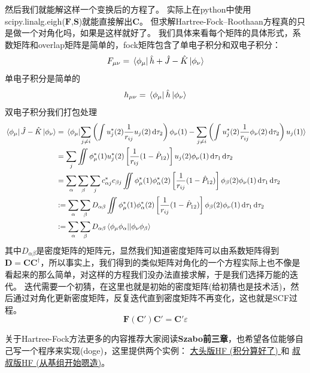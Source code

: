 然后我们就能解这样一个变换后的方程了。
实际上在python中使用scipy.linalg.eigh($\mathbf{F}$,$\mathbf{S}$)就能直接解出$\mathbf{C}$。
但求解Hartree-Fock–Roothaan方程真的只是做一个对角化吗，如果是这样就好了。
我们具体来看每个矩阵的具体形式，系数矩阵和overlap矩阵是简单的，fock矩阵包含了单电子积分和双电子积分：
\[F_{\mu\nu} = \bra*{\phi_{\mu}}\hat{h} + \hat{J} - \hat{K}\ket*{\phi_{\nu}}\]
单电子积分是简单的
\[h_{\mu\nu}=\bra*{\phi_{\mu}}\hat{h}\ket*{\phi_{\nu}}\]
双电子积分我们打包处理
\begin{equation*}
    \begin{aligned}
        \bra*{\phi_{\mu}}\hat{J} - \hat{K}\ket*{\phi_{\nu}} & = \bra*{\phi_{\mu}}\ket{\sum_{j \neq i}\left(\int u_j^*(2)\frac{1}{r_{ij}}u_j(2)\dd{\tau_2}\right)\phi_{\nu}(1)-\sum_{j \neq i}\left(\int u_j^*(2)\frac{1}{r_{ij}}\phi_{\nu}(2)\dd{\tau_2}\right)u_j(1)} \\
         & = \sum_{j}\iint \phi_{\mu}^*(1)u_j^*(2)\left[\frac{1}{r_{ij}}(1-\hat{P}_{12})\right]u_j(2)\phi_{\nu}(1) \dd{\tau_1}\dd{\tau_2} \\
         & = \sum_{\alpha}\sum_{\beta}\sum_{j}c^*_{\alpha j}c_{\beta j}\iint \phi_{\mu}^*(1)\phi_{\alpha}^*(2)\left[\frac{1}{r_{ij}}(1-\hat{P}_{12})\right]\phi_{\beta}(2)\phi_{\nu}(1) \dd{\tau_1}\dd{\tau_2} \\
         & := \sum_{\alpha}\sum_{\beta}D_{\alpha\beta}\iint \phi_{\mu}^*(1)\phi_{\alpha}^*(2)\left[\frac{1}{r_{ij}}(1-\hat{P}_{12})\right]\phi_{\beta}(2)\phi_{\nu}(1) \dd{\tau_1}\dd{\tau_2} \\
         & := \sum_{\alpha}\sum_{\beta}D_{\alpha\beta}\bra{\phi_{\mu}\phi_{\alpha}}\ket{|\phi_{\nu}\phi_{\beta}}
    \end{aligned}
\end{equation*}
其中$D_{\alpha\beta}$是密度矩阵的矩阵元，显然我们知道密度矩阵可以由系数矩阵得到$\mathbf{D}=\mathbf{C}\mathbf{C}^{\dagger}$，所以事实上，我们得到的类似矩阵对角化的一个方程实际上也不像是看起来的那么简单，对这样的方程我们没办法直接求解，于是我们选择万能的迭代。
迭代需要一个初猜，在这里也就是初始的密度矩阵(给初猜也是技术活)，然后通过对角化更新密度矩阵，反复迭代直到密度矩阵不再变化，这也就是SCF过程。
\[\mathbf{F}(\mathbf{C}')\mathbf{C}'=\mathbf{C}'\varepsilon\]

关于Hartree-Fock方法更多的内容推荐大家阅读\textbf{Szabo前三章}，也希望各位能够自己写一个程序来实现(doge)，这里提供两个实例：
\href{https://github.com/yangdatou/hf-tutorial}{大头版HF (积分算好了) }和
\href{https://github.com/Walter-Feng/Hartree-Fock-in-CPP}{叔叔版HF (从基组开始嗯造)}。

